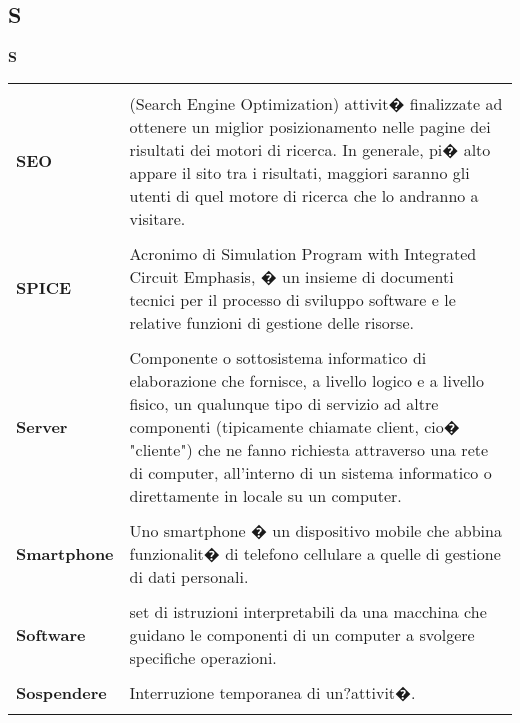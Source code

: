 {\subsection{S} 
\hfill\Huge{\textbf{S}} \\ 
\normalsize 
\begin{longtabu} to 
\toprule \\ 
\textbf{SEO} & (Search Engine Optimization) attivit� finalizzate ad ottenere un miglior posizionamento nelle pagine dei risultati dei motori di ricerca. In generale, pi� alto appare il sito tra i risultati, maggiori saranno gli utenti di quel motore di ricerca che lo andranno a visitare. \\ 
 \\ 
\textbf{SPICE} & Acronimo di Simulation Program with Integrated Circuit Emphasis, � un insieme di documenti tecnici per il processo di sviluppo software e le relative funzioni di gestione delle risorse. \\ 
 \\ 
\textbf{Server} & Componente o sottosistema informatico di elaborazione che fornisce, a livello logico e a livello fisico, un qualunque tipo di servizio ad altre componenti (tipicamente chiamate client, cio� "cliente") che ne fanno richiesta attraverso una rete di computer, all'interno di un sistema informatico o direttamente in locale su un computer. \\ 
 \\ 
\textbf{Smartphone} & Uno smartphone � un dispositivo mobile che abbina funzionalit� di telefono cellulare a quelle di gestione di dati personali. \\ 
 \\ 
\textbf{Software} & set di istruzioni interpretabili da una macchina che guidano le componenti di un computer a svolgere specifiche operazioni. \\ 
 \\ 
\textbf{Sospendere} & Interruzione temporanea di un?attivit�. \\ 
 \\ 
\end{longtabu} 
\newpage 
}
